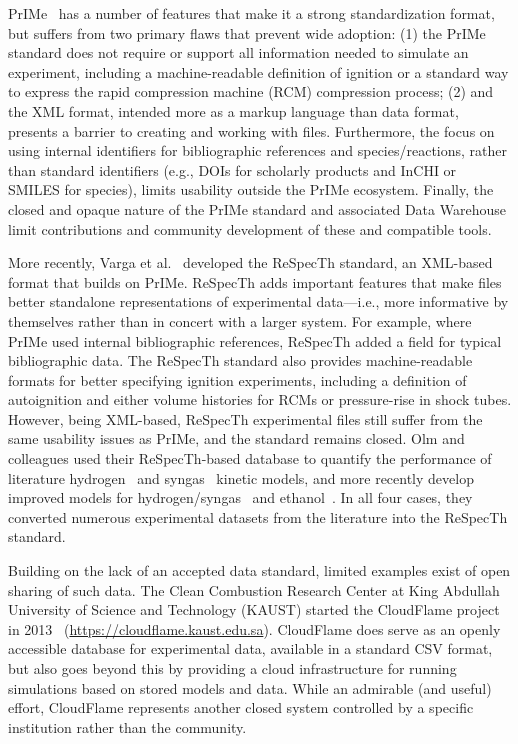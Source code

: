 \documentclass[12pt]{ussci}
\begin{document}
PrIMe~\autocite{Frenklach:2007bm,You:2011hy} has a number of features that make it
a strong standardization format, but suffers from two primary flaws that
prevent wide adoption: (1) the PrIMe standard does not require or support all information
needed to simulate an experiment, including a machine-readable definition of ignition or a
standard way to express the rapid compression machine (RCM) compression process; (2) and
the XML format, intended more as a markup language than data format, presents a barrier
to creating and working with files.
Furthermore, the focus on using internal identifiers for bibliographic references and
species\slash reactions, rather than standard identifiers (e.g., DOIs for scholarly products
and InCHI or SMILES for species), limits usability outside the PrIMe ecosystem.
Finally, the closed and opaque nature of the PrIMe standard and associated Data Warehouse
limit contributions and community development of these and compatible tools.

More recently, Varga et al.~\autocite{Varga2015a,Varga2015b} developed the ReSpecTh standard,
an XML-based format that builds on PrIMe. ReSpecTh adds important features that make files
better standalone representations of experimental data---i.e., more informative by themselves
rather than in concert with a larger system.
For example, where PrIMe used internal bibliographic references, ReSpecTh added a field for
typical bibliographic data. The ReSpecTh standard also provides machine-readable formats
for better specifying ignition experiments, including a definition of autoignition and
either volume histories for RCMs or pressure-rise in shock tubes.
However, being XML-based, ReSpecTh experimental files still suffer from the same usability
issues as PrIMe, and the standard remains closed.
Olm and colleagues used their ReSpecTh-based database to quantify the performance of literature
hydrogen~\autocite{Olm:2014gn} and syngas~\autocite{Olm:2015ch} kinetic models, and more recently
develop improved models for hydrogen\slash syngas~\autocite{Varga:2016gj} and
ethanol~\autocite{Olm:2016et}. In all four cases, they converted numerous experimental datasets
from the literature into the ReSpecTh standard.

Building on the lack of an accepted data standard, limited examples exist of open sharing
of such data. The Clean Combustion Research Center at King Abdullah University of Science
and Technology (KAUST) started the CloudFlame project in 2013~\autocite{Goteng:2013cf}
(\url{https://cloudflame.kaust.edu.sa}). CloudFlame does serve as an openly accessible database
for experimental data, available in a standard CSV format, but also goes beyond this by
providing a cloud infrastructure for running simulations based on stored models and data.
While an admirable (and useful) effort, CloudFlame represents another closed system controlled
by a specific institution rather than the community.
\end{document}
